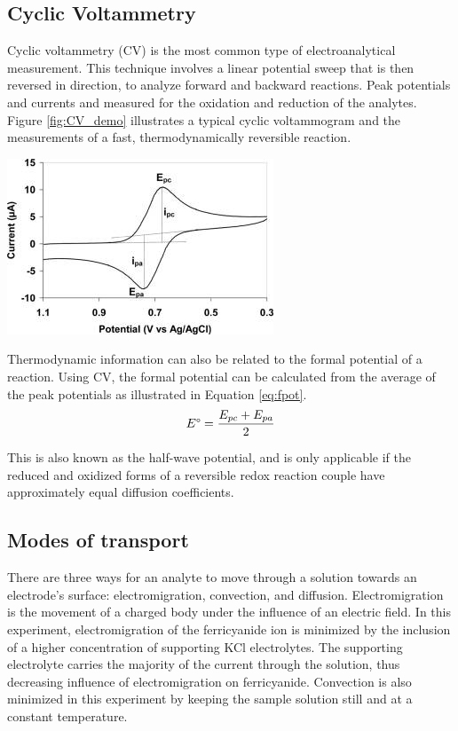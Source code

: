 \documentclass{article}
\begin{document}
\begin{multicols}{2}
{\subsection*{Cyclic Voltammetry}
Cyclic voltammetry (CV) is the most common type of electroanalytical measurement. 
This technique involves a linear potential sweep that is then reversed in
direction, to analyze forward and backward reactions. Peak potentials and
currents and measured for the oxidation and reduction of the analytes.
Figure \ref{fig:CV_demo} illustrates a typical cyclic voltammogram and the
measurements of a fast, thermodynamically reversible reaction.
\begin{center}
    \includegraphics[scale=0.6]{CV_demo}
    \label{fig:CV_demo}
\end{center}

Thermodynamic information can also be related to the formal potential of a reaction.
Using CV, the formal potential can be calculated from the average of the peak
potentials as illustrated in Equation \ref{eq:fpot}.
\begin{equation}
    E\degree = \frac{E_{pc} + E_{pa}}{2}
    \label{eq:fpot}
\end{equation}

This is also known as the half-wave potential, and is only applicable if the
reduced and oxidized forms of a reversible redox reaction couple have
approximately equal diffusion coefficients.


\subsection*{Modes of transport}
There are three ways for an analyte to move through a solution towards an
electrode's surface: electromigration, convection, and diffusion. Electromigration is the
movement of a charged body under the influence of an electric field. In this
experiment, electromigration of the ferricyanide ion is minimized by the inclusion of a
higher concentration of supporting KCl electrolytes. The supporting electrolyte
carries the majority of the current through the solution, thus decreasing
influence of electromigration on ferricyanide. Convection is also minimized in
this experiment by keeping the sample solution still and at a constant
temperature. 

}
\end{multicols}
\end{document}
